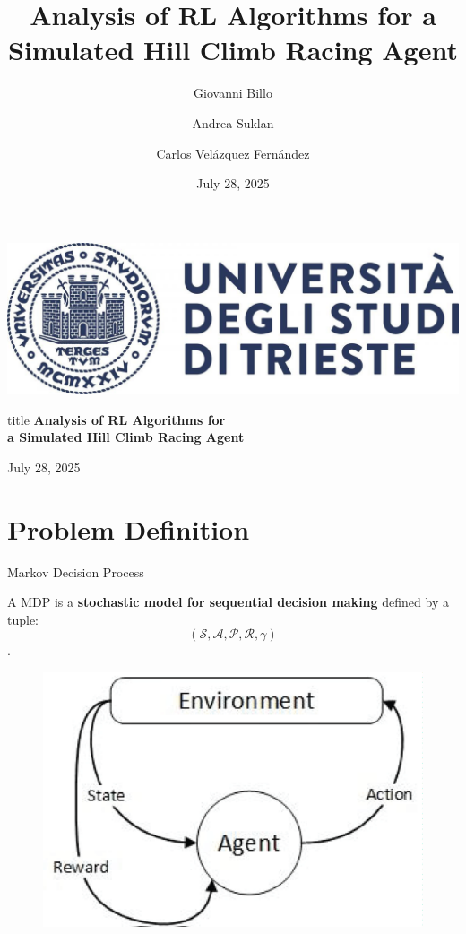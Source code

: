 \documentclass[serif]{beamer}  %
\author{
    Giovanni Billo
    \and  
    Andrea Suklan
    \and  
    Carlos Velázquez Fernández
}
\title{Analysis of RL Algorithms for a Simulated Hill Climb Racing Agent}
\date{\small July 28, 2025}
\begin{document}
\begin{frame}
    \vfill
    \begin{center}
        \includegraphics[keepaspectratio, scale=0.15]{images/logo.jpg}
        \vspace{1cm}
        \begin{beamercolorbox}[wd=\textwidth,center,rounded=true]{title}
            \textbf{Analysis of RL Algorithms for \\ a Simulated Hill Climb Racing Agent}
        \end{beamercolorbox}
        \vspace{1cm}
        {July 28, 2025}
    \end{center}
    \vfill
\end{frame} 

\begin{frame}    
\tableofcontents[sectionstyle=show,
subsectionstyle=show/shaded/hide,
subsubsectionstyle=show/shaded/hide]
\end{frame}

\section{Problem Definition}

    \begin{frame}{Markov Decision Process}

    A MDP is a \textbf{stochastic model for sequential decision making} defined by a tuple: $$(\mathcal{S}, \mathcal{A}, \mathcal{P}, \mathcal{R}, \gamma)$$.

    \begin{figure}
            \centering
            \includegraphics[width=0.65\linewidth]{images/md.png}
    \end{figure}
        
    \end{frame}
\end{document}
